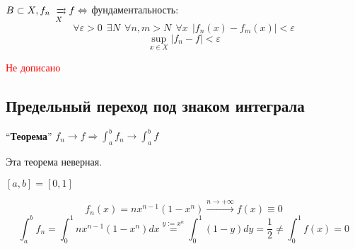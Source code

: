 $B\subset X, f_n\xrightrightarrows[X]{}f \Leftrightarrow$ фундаментальность:
\begin{equation}
    \forall \varepsilon > 0 \ \ \exists N \ \ \forall n, m > N \ \ \forall x \ \ |f_n(x) - f_m(x)| < \varepsilon \label{fund}
\end{equation}
\begin{equation}
    \sup_{x\in X} |f_n - f| < \varepsilon \label{sup_fund}
\end{equation}

\textcolor{red}{Не дописано}

\subsection*{Предельный переход под знаком интеграла}

``\textbf{Теорема}'' $f_n \to f \Rightarrow \int_a^b f_n \to \int_a^b f$

Эта теорема неверная.

\begin{example}
    $[a, b] = [0, 1]$

    $$f_n(x) = n x^{n-1} (1-x^n) \xrightarrow{n\to+\infty} f(x) \equiv 0$$
    $$\int_a^b f_n = \int_0^1 nx^{n-1}(1-x^n) dx \stackrel{y:=x^n}{=} \int_0^1 (1-y)dy = \frac{1}{2} \not= \int_0^1 f(x) = 0$$
\end{example}

